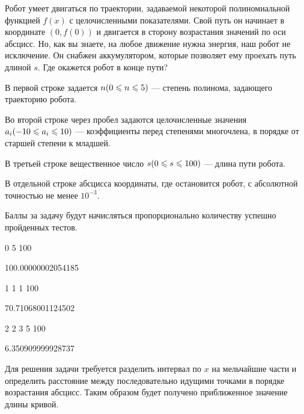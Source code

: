 
Робот умеет двигаться по траектории, задаваемой некоторой полиномиальной функцией $f(x)$ с 
целочисленными показателями. Свой путь он начинает в координате $(0, f(0))$  и двигается в 
сторону возрастания значений по оси абсцисс. Но, как вы знаете, на любое движение нужна 
энергия, наш робот не исключение. Он снабжен аккумулятором, которые позволяет ему 
проехать путь длиной $s$. Где окажется робот в конце пути?  


В первой строке задается $n \space (0 \leq n \leq 5)$  — степень полинома, задающего 
траекторию робота.

Во второй строке через пробел задаются целочисленные значения $a_i \space (-10 \leq a_i \leq 10)$  — 
коэффициенты перед степенями многочлена, в порядке от старшей степени к младшей.

В третьей строке вещественное число $s \space (0 \leq s \leq 100)$  — длина пути робота.

\outputfmtSection

В отдельной строке абсцисса координаты, где остановится робот, с абсолютной точностью не менее $10^{-3}$.

\markSection

Баллы за задачу будут начисляться пропорционально количеству успешно пройденных тестов.


\begin{myverbbox}[\small]{\vinput}
    0
    5
    100
\end{myverbbox}

\begin{myverbbox}[\small]{\voutput}
    100.00000002054185
\end{myverbbox}


\begin{myverbbox}[\small]{\vinput}
    1
    1 1
    100
\end{myverbbox}

\begin{myverbbox}[\small]{\voutput}
    70.71068001124502
\end{myverbbox}


\begin{myverbbox}[\small]{\vinput}
    2
    2 3 5
    100
\end{myverbbox}

\begin{myverbbox}[\small]{\voutput}
    6.350909999928737
\end{myverbbox}

\solutionSection

Для решения задачи требуется разделить интервал по $x$ на мельчайшие части и определить расстояние между последовательно идущими точками в порядке возрастания абсцисс. Таким образом будет получено приближенное значение длины кривой.

